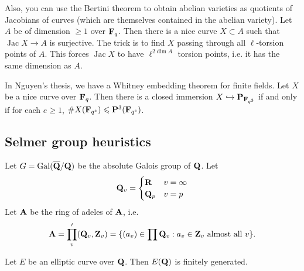 Also, you can use the Bertini theorem to obtain abelian varieties as quotients 
of Jacobians of curves (which are themselves contained in the abelian variety). 
Let $A$ be of dimension $\geq 1$ over $\mathbf{F}_q$. Then there is a nice curve 
$X\subset A$ such that $\operatorname{Jac} X\to A$ is surjective. The trick 
is to find $X$ passing through all $\ell$-torsion points of $A$. This forces 
$\operatorname{Jac} X$ to have $\ell^{2\dim A}$ torsion points, i.e. it has 
the same dimension as $A$. 

In Nguyen's thesis, we have a Whitney embedding theorem for finite fields. 
Let $X$ be a nice curve over $\mathbf{F}_q$. Then there is a closed immersion 
$X\hookrightarrow \mathbf{P}_{\mathbf{F}_{q^3}}$ if and only if for each $e\geq 1$, 
$\# X(\mathbf{F}_{q^e}) \leqslant \mathbf{P}^3(\mathbf{F}_{q^e})$. 





\subsection{Selmer group heuristics}

Let $G=\operatorname{Gal}(\overline{\mathbf{Q}}/\mathbf{Q})$ be the absolute Galois group of $\mathbf{Q}$. Let 
\[
  \mathbf{Q}_v = \begin{cases} \mathbf{R} & v=\infty \\ \mathbf{Q}_p & v=p \end{cases}
\]
Let $\mathbf{A}$ be the ring of adeles of $\mathbf{A}$, i.e. 
\[
  \mathbf{A} = \prod_v' (\mathbf{Q}_v,\mathbf{Z}_v) = \{(a_v)\in \prod \mathbf{Q}_v:a_v\in \mathbf{Z}_v\text{ almost all }v\} .
\]


\begin{theorem}
Let $E$ be an elliptic curve over $\mathbf{Q}$. Then $E(\mathbf{Q})$ is finitely generated. 
\end{theorem}

